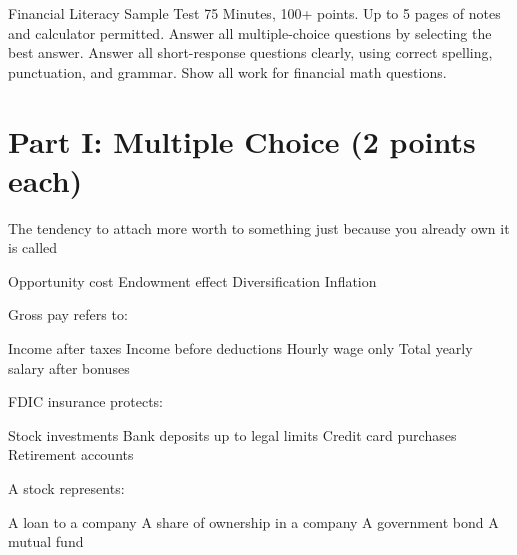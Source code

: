\documentclass[12pt]{exam}
\begin{document}


\FontEasyRead

\Heading
{Financial Literacy}
{Sample Test}
{75 Minutes, 100+ points.
	Up to 5 pages of notes and calculator permitted.
	Answer all multiple-choice questions by selecting the best answer.
	Answer all short-response questions clearly, using correct spelling, punctuation, and grammar.
	Show all work for financial math questions.}

\section*{Part I: Multiple Choice (2 points each)}

\begin{questions}

	\begin{mcquestion}[2]
		The tendency to attach more worth to something just because you already own it is called
		\begin{choices}
			\choice Opportunity cost
			\CorrectChoice Endowment effect
			\choice Diversification
			\choice Inflation
		\end{choices}
	\end{mcquestion}
	
	\begin{mcquestion}[2]
		Gross pay refers to:
		\begin{choices}
			\choice Income after taxes
			\CorrectChoice Income before deductions
			\choice Hourly wage only
			\choice Total yearly salary after bonuses
		\end{choices}
	\end{mcquestion}
	
	\begin{mcquestion}[2]
		FDIC insurance protects:
		\begin{choices}
			\choice Stock investments
			\CorrectChoice Bank deposits up to legal limits
			\choice Credit card purchases
			\choice Retirement accounts
		\end{choices}
	\end{mcquestion}
	
	\begin{mcquestion}[2]
		A stock represents:
		\begin{choices}
			\choice A loan to a company
			\CorrectChoice A share of ownership in a company
			\choice A government bond
			\choice A mutual fund
		\end{choices}
	\end{mcquestion}
	

\end{questions}
\end{document}
